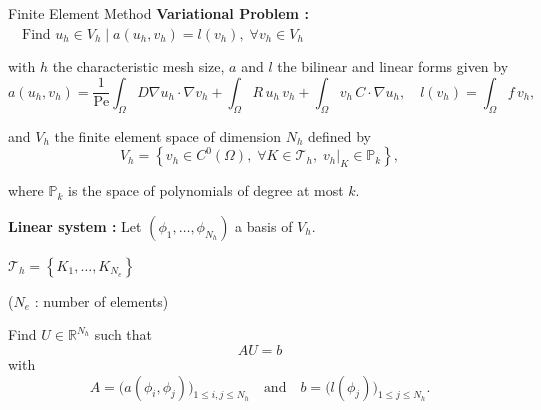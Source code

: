 \begin{frame}{Finite Element Method}	
	\textbf{Variational Problem :} $\quad \text{Find } u_h\in V_h \; | \; a(u_h,v_h)=l(v_h), \;\forall v_h\in V_h$

	\vspace{1pt}
	with $h$ the characteristic mesh size, $a$ and $l$ the bilinear and linear forms given by
	\vspace{-3pt}
	\begin{equation*}
		a(u_h,v_h)=
		\frac{1}{\text{Pe}} \int_{\Omega}D \nabla u_h \cdot  \nabla v_h+
		\int_{\Omega} R \, u_h \, v_h  +
		\int_{\Omega} v_h \, C \cdot \nabla u_h, \quad l(v_h)=\int_{\Omega} f \, v_h,
	\end{equation*}

	\begin{minipage}[t]{0.7\linewidth}
		\vspace{-3pt}
		and $V_h$ the finite element space of dimension $N_h$ defined by
		\vspace{-3pt}
		\begin{equation*}
			V_h = \left\{v_h\in C^0(\Omega),\; \forall K\in \mathcal{T}_h,\; v_h\vert_{K}\in\mathbb{P}_k\right\},
		\end{equation*}

		\vspace{-3pt}
		where $\mathbb{P}_k$ is the space of polynomials of degree at most $k$.

		\vspace{10pt}
		\textbf{Linear system :} Let $(\phi_1,\dots,\phi_{N_h})$ a basis of $V_h$.
	\end{minipage} \qquad \begin{minipage}[t][][b]{0.2\linewidth}
		\centering
		
		\footnotesize
		$\mathcal{T}_h = \left\{K_1,\dots,K_{N_e}\right\}$
		
		\tiny
		($N_e$ : number of elements)
	\end{minipage}

	\vspace{-5pt}
	Find $U\in\mathbb{R}^{N_h}$ such that 
	$$AU=b$$	
	with 
	\begin{equation*}
		A=\big(a(\phi_i,\phi_j)\big)_{1\le i,j\le N_h} \quad \text{and} \quad b=\big(l(\phi_j)\big)_{1\le j\le N_h}.
	\end{equation*}
\end{frame}